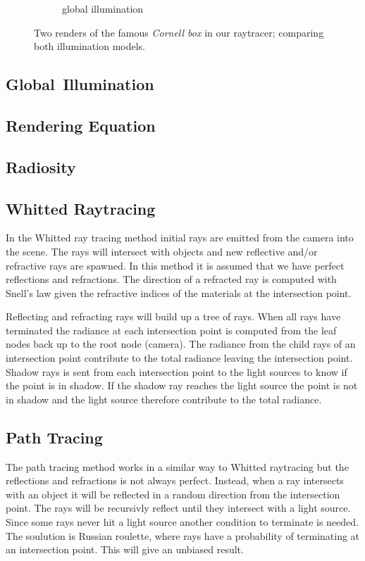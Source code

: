 \documentclass[a4paper, twocolumn]{article}
\begin{document}
\begin{figure}[ht]
\begin{subfigure}{0.48\linewidth}
            \caption{global illumination}
        \end{subfigure}
        \caption{Two renders of the famous \emph{Cornell box} in our raytracer; comparing both illumination models.}
    \end{figure}

    \subsection{Global\, Illumination} \label{sec:global_illumination}

    \subsection{Rendering Equation} \label{sec:rendering_equation}

    \subsection{Radiosity} \label{sec:radiosity}

    \subsection{Whitted Raytracing} \label{sec:whitted_raytracing}
    In the Whitted ray tracing method initial rays are emitted from the camera into the scene. The rays will intersect with objects and new reflective and/or refractive rays are spawned. In this method it is assumed that we have perfect reflections and refractions. The direction of a refracted ray is computed with Snell's law given the refractive indices of the materials at the intersection point.

    Reflecting and refracting rays will build up a tree of rays. When all rays have terminated the radiance at each intersection point is computed from the leaf nodes back up to the root node (camera). The radiance from the child rays of an intersection point contribute to the total radiance leaving the intersection point. Shadow rays is sent from each intersection point to the light sources to know if the point is in shadow. If the shadow ray reaches the light source the point is not in shadow and the light source therefore contribute to the total radiance. 

    \subsection{Path Tracing} \label{sec:path_tracing}
    The path tracing method works in a similar way to Whitted raytracing but the reflections and refractions is not always perfect. Instead, when a ray intersects with an object it will be reflected in a random direction from the intersection point. The rays will be recursivly reflect until they intersect with a light source. Since some rays never hit a light source another condition to terminate is needed. The soulution is Russian roulette, where rays have a probability of terminating at an intersection point. This will give an unbiased result.
\end{document}
